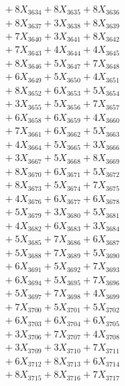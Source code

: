 \documentclass[a4paper,10pt]{article}
\begin{document}
{\begin{align}
&\;  + 8 X_{3634} + 8 X_{3635} + 8 X_{3636} \\[0.3ex]
&\;  + 8 X_{3637} + 3 X_{3638} + 8 X_{3639} \\[0.5ex]\allowbreak
&\;  + 7 X_{3640} + 3 X_{3641} + 8 X_{3642} \\[0.3ex]
&\;  + 7 X_{3643} + 4 X_{3644} + 4 X_{3645} \\[0.3ex]
&\;  + 8 X_{3646} + 5 X_{3647} + 7 X_{3648} \\[0.3ex]
&\;  + 6 X_{3649} + 5 X_{3650} + 4 X_{3651} \\[0.3ex]
&\;  + 8 X_{3652} + 6 X_{3653} + 5 X_{3654} \\[0.3ex]
&\;  + 3 X_{3655} + 5 X_{3656} + 7 X_{3657} \\[0.3ex]
&\;  + 6 X_{3658} + 6 X_{3659} + 4 X_{3660} \\[0.3ex]
&\;  + 7 X_{3661} + 6 X_{3662} + 5 X_{3663} \\[0.3ex]
&\;  + 4 X_{3664} + 5 X_{3665} + 3 X_{3666} \\[0.3ex]
&\;  + 3 X_{3667} + 5 X_{3668} + 8 X_{3669} \\[0.5ex]\allowbreak
&\;  + 8 X_{3670} + 6 X_{3671} + 5 X_{3672} \\[0.3ex]
&\;  + 8 X_{3673} + 5 X_{3674} + 7 X_{3675} \\[0.3ex]
&\;  + 4 X_{3676} + 6 X_{3677} + 6 X_{3678} \\[0.3ex]
&\;  + 5 X_{3679} + 3 X_{3680} + 5 X_{3681} \\[0.3ex]
&\;  + 4 X_{3682} + 6 X_{3683} + 3 X_{3684} \\[0.3ex]
&\;  + 5 X_{3685} + 7 X_{3686} + 6 X_{3687} \\[0.3ex]
&\;  + 5 X_{3688} + 7 X_{3689} + 5 X_{3690} \\[0.3ex]
&\;  + 6 X_{3691} + 5 X_{3692} + 7 X_{3693} \\[0.3ex]
&\;  + 6 X_{3694} + 5 X_{3695} + 7 X_{3696} \\[0.3ex]
&\;  + 5 X_{3697} + 7 X_{3698} + 4 X_{3699} \\[0.5ex]\allowbreak
&\;  + 7 X_{3700} + 5 X_{3701} + 5 X_{3702} \\[0.3ex]
&\;  + 6 X_{3703} + 6 X_{3704} + 6 X_{3705} \\[0.3ex]
&\;  + 3 X_{3706} + 7 X_{3707} + 4 X_{3708} \\[0.3ex]
&\;  + 3 X_{3709} + 3 X_{3710} + 7 X_{3711} \\[0.3ex]
&\;  + 6 X_{3712} + 8 X_{3713} + 6 X_{3714} \\[0.3ex]
&\;  + 8 X_{3715} + 8 X_{3716} + 7 X_{3717} \\[0.3ex]

\end{align}}
\end{document}
